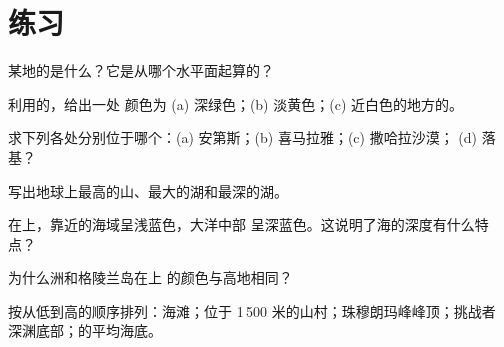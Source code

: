 \section{练习}

\begin{exercise}[$\star$]\label{exo:g4:world-physical-map:1}
某地的是什么？它是从哪个水平面起算的？
\end{exercise}

\begin{exercise}[$\star$]\label{exo:g4:world-physical-map:2}
利用的，给出一处
颜色为 (a) 深绿色；(b) 淡黄色；(c) 近白色的地方的。
\end{exercise}

\begin{exercise}[$\star$]\label{exo:g4:world-physical-map:3}
求下列各处分别位于哪个：(a) 安第斯；(b) 喜马拉雅；(c) 撒哈拉沙漠；
(d) 落基？
\end{exercise}

\begin{exercise}[$\star$]\label{exo:g4:world-physical-map:4}
写出地球上最高的山、最大的湖和最深的湖。
\end{exercise}

\begin{exercise}[$\star$]\label{exo:g4:world-physical-map:5}
在上，靠近的海域呈浅蓝色，大洋中部
呈深蓝色。这说明了海的深度有什么特点？
\end{exercise}

\begin{exercise}[$\star$]\label{exo:g4:world-physical-map:6}
为什么洲和格陵兰岛在上
的颜色与高地相同？
\end{exercise}

\begin{exercise}[$\star\star$]\label{exo:g4:world-physical-map:7}
按从低到高的顺序排列：海滩；位于
1\,500 米的山村；珠穆朗玛峰峰顶；挑战者
深渊底部；的平均海底。
\end{exercise}

